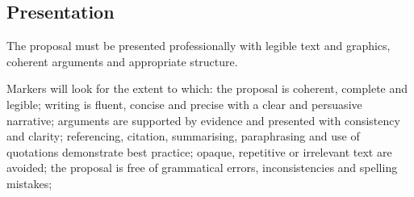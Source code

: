 \subsection{Presentation}

The proposal must be presented professionally with legible text and graphics, coherent arguments and appropriate structure.

Markers will look for the extent to which: the proposal is coherent, complete and legible; writing is fluent, concise and precise with a clear and persuasive narrative; arguments are supported by evidence and presented with consistency and clarity; referencing, citation, summarising, paraphrasing and use of quotations demonstrate best practice; opaque, repetitive or irrelevant text are avoided; the proposal is free of grammatical errors, inconsistencies and spelling mistakes;



